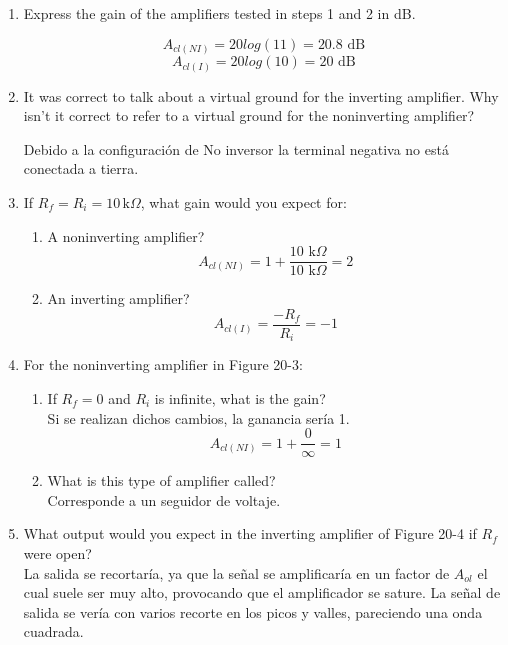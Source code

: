 \documentclass[11pt]{article}
\begin{document}
\begin{enumerate}[label=\arabic*.]
    \item Express the gain of the amplifiers tested in steps 1 and 2 in dB.
    
    \[A_{cl(NI)} = 20 log(11) = 20.8\text{ dB}\]
    \[A_{cl(I)} = 20 log(10)  = 20\text{ dB}\]

    \vspace{2.5cm}

    \item It was correct to talk about a virtual ground for the inverting amplifier. Why isn't it correct to refer to a virtual ground for the noninverting amplifier?
    
    Debido a la configuración de No inversor la terminal negativa no está conectada a tierra.

    \vspace{2.5cm}

    \item If $R_f = R_i = 10\,\text{k}\Omega$, what gain would you expect for:
    \begin{enumerate}[label=\alph*.]
        \item A noninverting amplifier?
        \[A_{cl(NI)}= 1 + \frac{10 \text{ k}\Omega}{10 \text{ k}\Omega} = 2\]
        \item An inverting amplifier?
        \[A_{cl(I)}= \frac{-R_f}{R_i} = -1\]
    \end{enumerate}

    \vspace{2.5cm}

    \item For the noninverting amplifier in Figure 20-3:
    \begin{enumerate}[label=\alph*.]
        \item If $R_f = 0$ and $R_i$ is infinite, what is the gain?\\
        Si se realizan dichos cambios, la ganancia sería 1.
        \[A_{cl(NI)} = 1 + \frac{0}{\infty} = 1\]

        \vspace{1cm}

        \item What is this type of amplifier called?\\
        Corresponde a un seguidor de voltaje.
    \end{enumerate}

    \vspace{2cm}

    \item What output would you expect in the inverting amplifier of Figure 20-4 if $R_f$ were open?\\
    La salida se recortaría, ya que la señal se amplificaría en un factor de $A_{ol}$ el cual suele ser muy alto, provocando que el amplificador se sature. La señal de salida se vería con varios recorte en los picos y valles, pareciendo una onda cuadrada.

    \vspace{2.5cm}
\end{enumerate}
\end{document}
